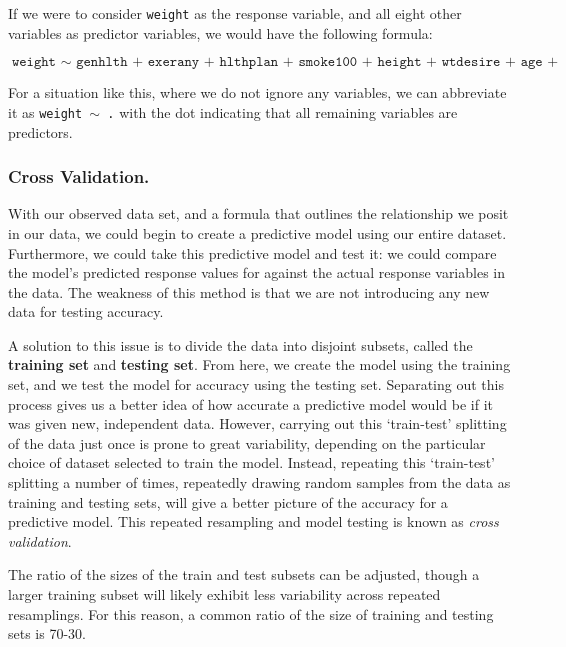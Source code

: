 \documentclass[12pt]{article}\usepackage[]{graphicx}\usepackage[]{color}
\begin{document}
	If we were to consider \texttt{weight} as the response variable, and all eight other variables as predictor variables, we would have the following formula:

$$\texttt{weight $\sim$ genhlth + exerany + hlthplan + smoke100 + height + wtdesire + age + gender}$$

For a situation like this, where we do not ignore any variables, we can abbreviate it as \texttt{weight $\sim$ .} with the dot indicating that all remaining variables are predictors.

	\subsubsection{Cross Validation.}
With our observed data set, and a formula that outlines the relationship we posit in our data, we could begin to create a predictive model using our entire dataset.  Furthermore, we could take this predictive model and test it: we could compare the model's predicted response values for against the actual response variables in the data.  The weakness of this method is that we are not introducing any new data for testing accuracy.  

A solution to this issue is to divide the data into disjoint subsets, called the \textbf{training set} and \textbf{testing set}.  From here, we 
create the model using the training set, and we test the model for accuracy using the testing set.  Separating out this process gives us a better 
idea of how accurate a predictive model would be if it was given new, independent data.  However, carrying out this `train-test' splitting of the data just 
once is prone to great variability, depending on the particular choice of dataset selected to train the model.  Instead, repeating this `train-test' 
splitting a number of times, repeatedly drawing random samples from the data as training and testing sets, will give a better picture of the 
accuracy for a predictive model.  This repeated resampling and model testing is known as \textit{cross validation}.

The ratio of the sizes of the train and test subsets can be adjusted, though a larger training subset will likely exhibit less variability across
repeated resamplings.  For this reason, a common ratio of the size of training and testing sets is 70-30.  %

\end{document}
